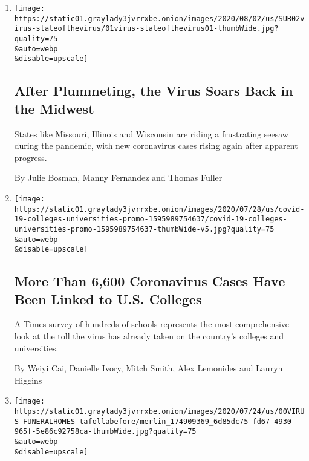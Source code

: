 \begin{enumerate}
\def\labelenumi{\arabic{enumi}.}
\item
  \href{/2020/08/01/us/coronavirus-midwest-cases-deaths.html}{}

  \texttt{[image: https://static01.graylady3jvrrxbe.onion/images/2020/08/02/us/SUB02virus-stateofthevirus/01virus-stateofthevirus01-thumbWide.jpg?quality=75\\\&auto=webp\\\&disable=upscale]}

  \hypertarget{after-plummeting-the-virus-soars-back-in-the-midwest}{%
  \subsection{After Plummeting, the Virus Soars Back in the
  Midwest}\label{after-plummeting-the-virus-soars-back-in-the-midwest}}

  States like Missouri, Illinois and Wisconsin are riding a frustrating
  seesaw during the pandemic, with new coronavirus cases rising again
  after apparent progress.

  By Julie Bosman, Manny Fernandez and Thomas Fuller
\item
  \href{/interactive/2020/07/28/us/covid-19-colleges-universities.html}{}

  \texttt{[image: https://static01.graylady3jvrrxbe.onion/images/2020/07/28/us/covid-19-colleges-universities-promo-1595989754637/covid-19-colleges-universities-promo-1595989754637-thumbWide-v5.jpg?quality=75\\\&auto=webp\\\&disable=upscale]}

  \hypertarget{more-than-6600-coronavirus-cases-have-been-linked-to-us-colleges}{%
  \subsection{More Than 6,600 Coronavirus Cases Have Been Linked to U.S.
  Colleges}\label{more-than-6600-coronavirus-cases-have-been-linked-to-us-colleges}}

  A Times survey of hundreds of schools represents the most
  comprehensive look at the toll the virus has already taken on the
  country's colleges and universities.

  By Weiyi Cai, Danielle Ivory, Mitch Smith, Alex Lemonides and Lauryn
  Higgins
\item
  \href{/2020/07/28/us/coronavirus-texas-funeral-homes.html}{}

  \texttt{[image: https://static01.graylady3jvrrxbe.onion/images/2020/07/24/us/00VIRUS-FUNERALHOMES-tafollabefore/merlin\_174909369\_6d85dc75-fd67-4930-965f-5e86c92758ca-thumbWide.jpg?quality=75\\\&auto=webp\\\&disable=upscale]}


\end{enumerate}
